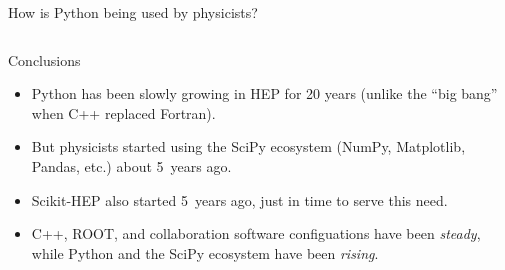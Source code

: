 \documentclass[aspectratio=169]{beamer}
\begin{document}
\begin{frame}{How is Python being used by physicists?}
\vspace{0.25 cm}
\textcolor{darkblue}{\mbox{\hspace{-0.5 cm}}}

\vspace{-0.35 cm}
\begin{columns}
\end{columns}
\end{frame}

\begin{frame}{Conclusions}
\large
\begin{itemize}\setlength{\itemsep}{0.25 cm}
\item<1-> Python has been slowly growing in HEP for 20 years (unlike the ``big bang'' when C++ replaced Fortran).
\item<2-> But physicists started using the SciPy ecosystem (NumPy, Matplotlib, Pandas, etc.) about 5~years ago.
\item<3-> Scikit-HEP also started 5~years ago, just in time to serve this need.
\item<4-> C++, ROOT, and collaboration software configuations have been {\it steady}, while Python and the SciPy ecosystem have been {\it rising}.
\end{itemize}
\end{frame}
\end{document}
